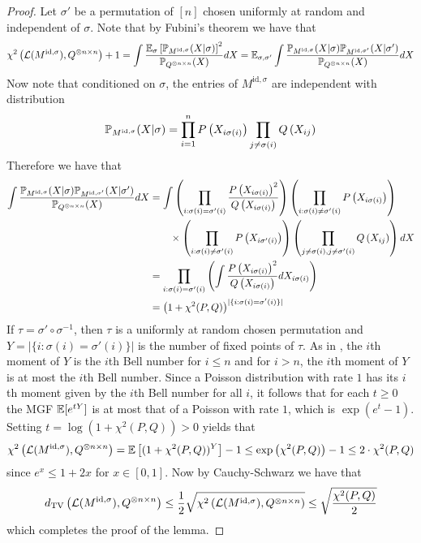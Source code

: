 \documentclass[11pt]{article}
\begin{document}
\begin{proof}
Let $\sigma'$ be a permutation of $[n]$ chosen uniformly at random and independent of $\sigma$. Note that by Fubini's theorem we have that
$$\chi^2\left( \mathcal{L}(M^{\text{id}, \sigma}), Q^{\otimes n \times n} \right) + 1 = \int \frac{\mathbb{E}_\sigma \left[ \mathbb{P}_{M^{\text{id}, \sigma}} ( X | \sigma) \right]^2}{\mathbb{P}_{Q^{\otimes n \times n}}(X)} dX = \mathbb{E}_{\sigma, \sigma'} \int \frac{\mathbb{P}_{M^{\text{id}, \sigma}} ( X | \sigma) \mathbb{P}_{M^{\text{id}, \sigma'}} ( X | \sigma')}{\mathbb{P}_{Q^{\otimes n \times n}}(X)} dX$$
Now note that conditioned on $\sigma$, the entries of $M^{\text{id}, \sigma}$ are independent with distribution
$$\mathbb{P}_{M^{\text{id}, \sigma}} ( X | \sigma) = \prod_{i = 1}^n P\left(X_{i \sigma(i)} \right) \prod_{j \neq \sigma(i)} Q\left(X_{ij} \right)$$
Therefore we have that
\begin{align*}
\int \frac{\mathbb{P}_{M^{\text{id}, \sigma}} ( X | \sigma) \mathbb{P}_{M^{\text{id}, \sigma'}} ( X | \sigma')}{\mathbb{P}_{Q^{\otimes n \times n}}(X)} dX &= \int \left( \prod_{i : \sigma(i) = \sigma'(i)} \frac{P\left(X_{i\sigma(i)}\right)^2}{Q\left(X_{i\sigma(i)}\right)} \right) \left( \prod_{i : \sigma(i) \neq \sigma'(i)} P\left(X_{i\sigma(i)}\right) \right) \\
&\quad \quad \times \left( \prod_{i : \sigma(i) \neq \sigma'(i)} P\left(X_{i\sigma'(i)}\right) \right) \left( \prod_{j \neq \sigma(i), j \neq \sigma'(i)} Q\left(X_{ij}\right) \right)dX \\
&= \prod_{i : \sigma(i) = \sigma'(i)} \left( \int \frac{P\left(X_{i\sigma(i)}\right)^2}{Q\left(X_{i\sigma(i)}\right)} dX_{i\sigma(i)} \right) \\
&= \left( 1 + \chi^2(P, Q) \right)^{|\{ i : \sigma(i) = \sigma'(i) \}|}
\end{align*}
If $\tau = \sigma' \circ \sigma^{-1}$, then $\tau$ is a uniformly at random chosen permutation and $Y = |\{ i : \sigma(i) = \sigma'(i) \}|$ is the number of fixed points of $\tau$. As in \cite{pitman1997some}, the $i$th moment of $Y$ is the $i$th Bell number for $i \le n$ and for $i > n$, the $i$th moment of $Y$ is at most the $i$th Bell number. Since a Poisson distribution with rate $1$ has its $i$th moment given by the $i$th Bell number for all $i$, it follows that for each $t \ge 0$ the MGF $\mathbb{E}[e^{tY}]$ is at most that of a Poisson with rate $1$, which is $\exp(e^t - 1)$. Setting $t = \log(1 + \chi^2(P, Q)) > 0$ yields that
$$\chi^2\left( \mathcal{L}(M^{\text{id}, \sigma}), Q^{\otimes n \times n} \right) = \mathbb{E}\left[ (1 + \chi^2(P, Q))^Y \right] - 1 \le \exp\left(\chi^2(P, Q)\right) - 1 \le 2 \cdot \chi^2(P, Q)$$
since $e^x \le 1 + 2x$ for $x \in [0, 1]$. Now by Cauchy-Schwarz we have that
$$d_{\text{TV}}\left( \mathcal{L}(M^{\text{id}, \sigma}), Q^{\otimes n \times n} \right) \le \frac{1}{2} \sqrt{\chi^2\left( \mathcal{L}(M^{\text{id}, \sigma}), Q^{\otimes n \times n} \right)} \le \sqrt{\frac{\chi^2(P, Q)}{2}}$$
which completes the proof of the lemma.
\end{proof}
\end{document}
